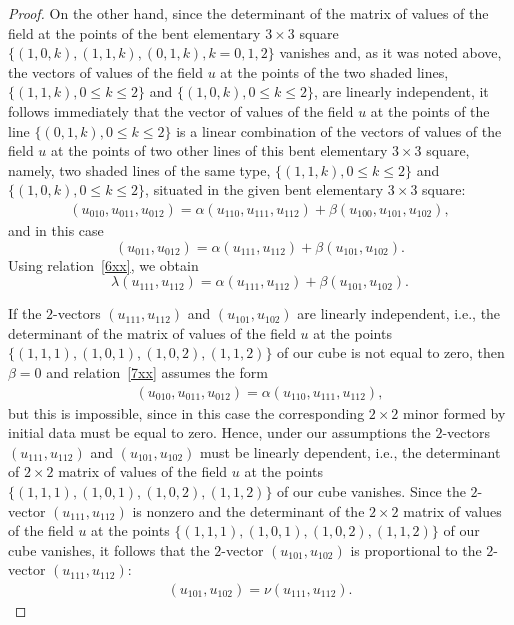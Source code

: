 \documentclass[11pt]{article}
\begin{document}
\begin{proof}
On the other hand, since the determinant of the matrix of values of
the f\/ield at the points of the bent elementary $3 \times 3$ square
$\{(1, 0, k), (1, 1, k), (0, 1, k), k = 0, 1, 2\}$ vanishes and, as
it was noted above, the vectors of values of the f\/ield $u$ at the
points of the two shaded lines, $\{(1, 1, k), 0 \leq k \leq 2\}$ and
$\{(1, 0, k), 0 \leq k \leq 2\}$, are linearly independent, it
follows immediately that the vector of values of the f\/ield $u$ at
the points of the line $\{(0, 1, k), 0 \leq k \leq 2\}$ is a linear
combination of the vectors of values of the f\/ield $u$ at the points
of two other lines of this bent elementary $3 \times 3$ square,
namely, two shaded lines of the same type, $\{(1, 1, k), 0 \leq k
\leq 2\}$ and $\{(1, 0, k), 0 \leq k \leq 2\}$, situated in the
given bent elementary $3 \times 3$ square:
\begin{gather} (u_{0 1 0}, u_{0 1 1}, u_{0 1 2}) = \alpha (u_{1 1 0}, u_{1 1
1}, u_{1 1 2}) + \beta (u_{1 0 0}, u_{1 0 1}, u_{1 0 2}),
\label{7xx}
\end{gather}
and in this case \[ (u_{0 1 1}, u_{0 1 2}) = \alpha
(u_{1 1 1}, u_{1 1 2}) + \beta (u_{1 0 1}, u_{1 0 2}). \] Using
relation~\eqref{6xx}, we obtain \[ \lambda (u_{1 1 1}, u_{1 1 2}) =
\alpha (u_{1 1 1}, u_{1 1 2}) + \beta (u_{1 0 1}, u_{1 0 2}). \]


If the $2$-vectors $(u_{1 1 1}, u_{1 1 2})$ and $(u_{1 0 1}, u_{1 0
2})$ are linearly independent, i.e., the determinant of the matrix
of values of the f\/ield $u$ at the points $\{(1, 1, 1), (1, 0, 1),
(1, 0, 2), (1, 1, 2)\}$ of our cube is not equal to zero, then
$\beta = 0$ and relation~\eqref{7xx} assumes the form
\begin{gather*}
(u_{0 1 0}, u_{0 1 1}, u_{0 1 2}) = \alpha (u_{1 1 0}, u_{1 1 1}, u_{1 1
2}), %
\end{gather*}
but this is impossible, since in this case the
corresponding $2 \times 2$ minor formed by initial data must be
equal to zero.
Hence, under our assumptions the $2$-vectors $(u_{1 1 1}, u_{1 1
2})$ and $(u_{1 0 1}, u_{1 0 2})$ must be linearly dependent, i.e.,
the determinant of $2 \times 2$ matrix of values of the f\/ield $u$ at
the points $\{(1, 1, 1), (1, 0, 1), (1, 0, 2), (1, 1, 2)\}$ of our
cube vanishes. Since the $2$-vector $(u_{1 1 1}, u_{1 1 2})$ is
nonzero and the determinant of the $2 \times 2$ matrix of values of
the f\/ield $u$ at the points $\{(1, 1, 1), (1, 0, 1), (1, 0, 2), (1,
1, 2)\}$ of our cube vanishes, it follows that the $2$-vector $(u_{1
0 1}, u_{1 0 2})$ is proportional to the $2$-vector $(u_{1 1 1},
u_{1 1 2})$: \begin{gather} (u_{1 0 1}, u_{1 0 2}) = \nu (u_{1 1 1}, u_{1 1
2}). \label{9xx}
\end{gather}



\end{proof}
\end{document}

